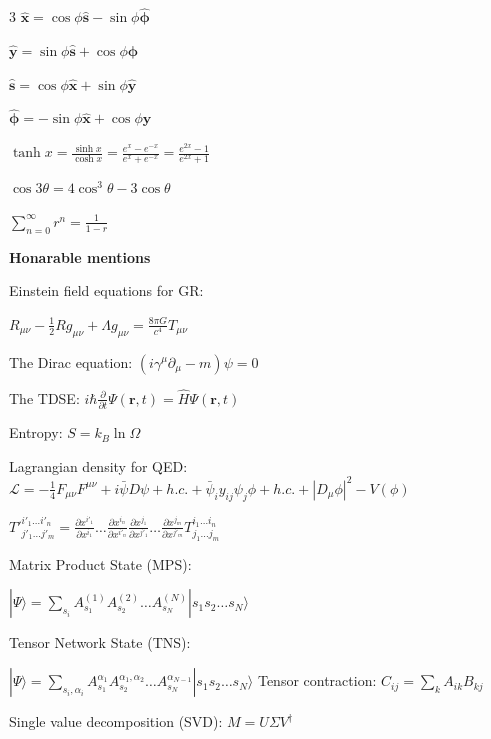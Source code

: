 \documentclass[a4paper,twoside]{article}
\newcommand{\secblock}[1]{%
\par\vspace{1.8pt}%
\noindent\colorbox{hdrcol}{\parbox[c][1.0em][c]{0.98\linewidth}{\color{white}\bfseries\small #1}}\par
\vspace{1pt}%
}
\begin{document}
\begin{multicols*}{3}
\(\hat{\bm x} = \cos \phi \hat{\bm s} - \sin \phi \hat{\bm \phi}\)

\(\hat{\bm y} = \sin \phi \hat{\bm s} + \cos \phi \hat{\bm \phi}\)



\(\hat{\bm s} = \cos \phi \hat{\bm x} + \sin \phi \hat{\bm y}\)

\(\hat{\bm \phi} = -\sin \phi \hat{\bm x} + \cos \phi \hat{\bm y}\)


\(\tanh x = \frac{\sinh x}{\cosh x} = \frac{e^x - e^{-x}}{e^x + e^{-x}} = \frac{e^{2x} -1}{e^{2x} + 1}\)

\(\cos 3 \theta = 4 \cos^3 \theta - 3 \cos \theta\)


\(\sum_{n=0}^{\infty} r^n = \frac{1}{1-r}\)


\secblock{Honarable mentions}

Einstein field equations for GR:

\(R_{\mu\nu} - \frac{1}{2}R g_{\mu\nu} + \Lambda g_{\mu\nu} = \frac{8\pi G}{c^4} T_{\mu\nu}\)

The Dirac equation:
\((i\gamma^\mu \partial_\mu - m)\psi = 0\)

The TDSE:
\(i\hbar \frac{\partial}{\partial t} \Psi(\mathbf{r}, t) = \hat{H} \Psi(\mathbf{r}, t)\)

Entropy:
\(S = k_B \ln \Omega\)

Lagrangian density for QED:
\(\mathcal{L} = -\frac{1}{4}F_{\mu\nu}F^{\mu\nu} + i\bar{\psi}D\psi + h.c. + \bar{\psi}_i y_{ij} \psi_j \phi + h.c. + |D_\mu \phi|^2 - V(\phi)\)


\(T'^{i'_1 \dots i'_n}_{j'_1 \dots j'_m} = \frac{\partial x^{i'_1}}{\partial x^{i_1}} \dots \frac{\partial x^{i_n}}{\partial x^{i'_n}} \frac{\partial x^{j_1}}{\partial x^{j'_1}} \dots \frac{\partial x^{j_m}}{\partial x^{j'_m}} T^{i_1 \dots i_n}_{j_1 \dots j_m}\)

Matrix Product State (MPS):

\(|\Psi\rangle = \sum_{s_i} A^{(1)}_{s_1} A^{(2)}_{s_2} \dots A^{(N)}_{s_N} |s_1 s_2 \dots s_N\rangle\)

Tensor Network State (TNS):

\(|\Psi\rangle = \sum_{s_i,\alpha_i} A_{s_1}^{\alpha_1} A^{ \alpha_1, \alpha_2}_{s_2} \dots A^{\alpha_{N-1}}_{s_N} |s_1 s_2 \dots s_N\rangle\)
Tensor contraction:
\(C_{ij} = \sum_{k} A_{ik} B_{kj}\)

Single value decomposition (SVD): \(M = U \Sigma V^\dagger\)

\end{multicols*}
\end{document}
